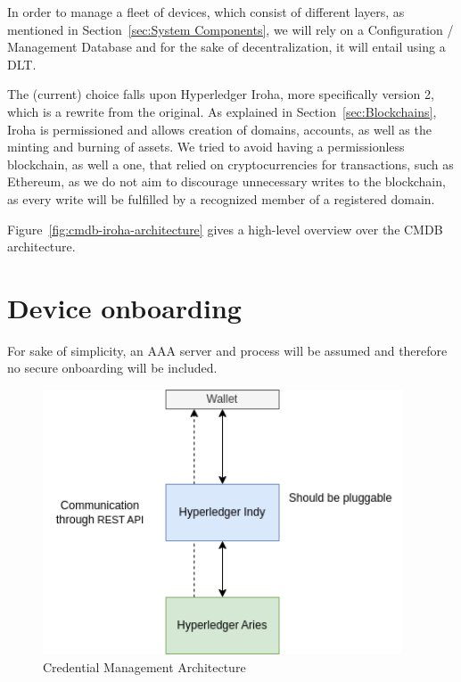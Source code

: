 In order to manage a fleet of devices, which consist of different layers, as mentioned in Section~\ref{sec:System Components},
we will rely on a Configuration / Management Database and for the sake of decentralization, it will entail using a DLT.

The (current) choice falls upon Hyperledger Iroha, more specifically version 2, which is a rewrite from the original.
As explained in Section~\ref{sec:Blockchains}, Iroha is permissioned and allows creation of domains, accounts, as well
as the minting and burning of assets.
We tried to avoid having a permissionless blockchain, as well a one, that relied on cryptocurrencies for transactions,
such as Ethereum, as we do not aim to discourage unnecessary writes to the blockchain, as every write will be fulfilled
by a recognized member of a registered domain.

Figure~\ref{fig:cmdb-iroha-architecture} gives a high-level overview over the CMDB architecture.


\section{Device onboarding} %
\label{sec:Device onboarding}

For sake of simplicity, an AAA server and process will be assumed and therefore no secure onboarding will be included.

\begin{figure}
	\begin{center}
		\includegraphics[width=0.95\textwidth]{figures/credential-architecture.png}
	\end{center}
	\caption{Credential Management Architecture}
	\label{fig:credential-architecture}
\end{figure}

